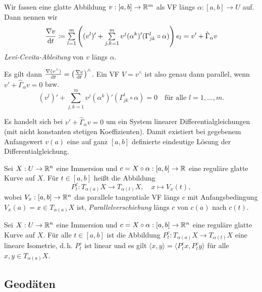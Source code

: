 \documentclass{cheat-sheet}
\begin{document}
\begin{definition}
  Wir fassen eine glatte Abbildung $v : [a, b] \to \mathbb{R}^m$ als VF längs $\alpha : [a, b] \to U$ auf. Dann nennen wir
  \[ \frac{\nabla v}{\d t} \coloneqq \sum_{l=1}^m \left( (v^l)' + \sum_{j,k=1}^m v^j (\alpha^k)' (\Gamma_{jk}^l \circ \alpha) \right) e_l = v' + \hat{\Gamma}_{\alpha} v \]
  \emph{Levi-Cevita-Ableitung} von $v$ längs $\alpha$.
\end{definition}

\begin{satz}
  Es gilt dann $\tfrac{\nabla (v^\wedge)}{\mathrm{d} t} = \left( \tfrac{\nabla v}{\mathrm{d} t} \right)^\wedge$. Ein VF $V = v^\wedge$ ist also genau dann parallel, wenn $v' + \hat{\Gamma}_\alpha v = 0$ bzw.
  \[ (v^l)' + \sum_{j,k=1}^m v^j (\alpha^k)' (\Gamma_{jk}^l \circ \alpha) = 0 \quad \text{für alle $l = 1, ..., m$.} \]
\end{satz}

\begin{bem}
  Es handelt sich bei $v' + \hat{\Gamma}_\alpha v = 0$ um ein System linearer Differentialgleichungen (mit nicht konstanten stetigen Koeffizienten). Damit existiert bei gegebenem Anfangswert $v(a)$ eine auf ganz $[a, b]$ definierte eindeutige Lösung der Differentialgleichung.
\end{bem}

\begin{definition}
  Sei $X : U \to \mathbb{R}^n$ eine Immersion und $c = X \circ \alpha : [a, b] \to \mathbb{R}$ eine reguläre glatte Kurve auf $X$. Für $t \in [a, b]$ heißt die Abbildung
  \[ P_t^c : T_{\alpha(a)} X \to T_{\alpha(t)} X, \quad x \mapsto V_x(t), \]
  wobei $V_x : [a, b] \to \mathbb{R}^n$ das parallele tangentiale VF längs $c$ mit Anfangsbedingung $V_x(a) = x \in T_{\alpha(a)} X$ ist, \emph{Parallelverschiebung} längs $c$ von $c(a)$ nach $c(t)$.
\end{definition}

\begin{samepage}

\begin{satz}
  Sei $X : U \to \mathbb{R}^n$ eine Immersion und $c = X \circ \alpha : [a, b] \to \mathbb{R}^n$ eine reguläre glatte Kurve auf $X$. Für alle $t \in [a, b]$ ist die Abbildung $P_t^c : T_{\alpha(a)} X \to T_{\alpha(t)} X$ eine lineare Isometrie, d.\,h. $P_t^c$ ist linear und es gilt $\langle x, y \rangle = \langle P_t^c x, P_t^c y \rangle$ für alle $x, y \in T_{\alpha(a)} X$.
\end{satz}


\subsection{Geodäten}

\end{samepage}
\end{document}
